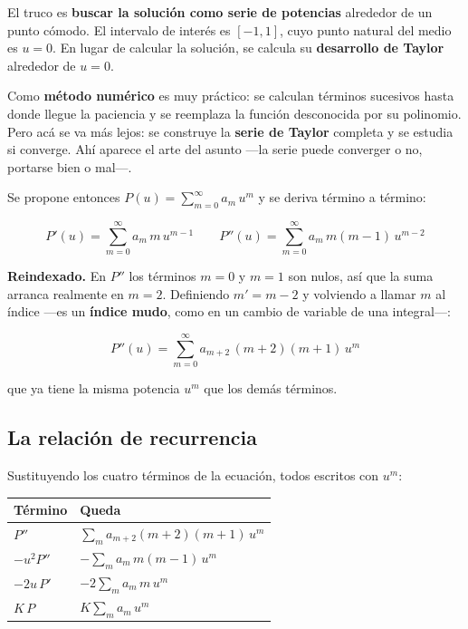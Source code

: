 \documentclass[12pt,a4paper]{article}
\begin{document}
El truco es \textbf{buscar la solución como serie de potencias} alrededor de un
punto cómodo. El intervalo de interés es $[-1,1]$, cuyo punto natural del medio
es $u=0$. En lugar de calcular la solución, se calcula su \textbf{desarrollo de
Taylor} alrededor de $u=0$.

\begin{notebox}
Como \textbf{método numérico} es muy práctico: se calculan términos sucesivos
hasta donde llegue la paciencia y se reemplaza la función desconocida por su
polinomio. Pero acá se va más lejos: se construye la \textbf{serie de Taylor}
completa y se estudia si converge. Ahí aparece el arte del asunto ---la serie
puede converger o no, portarse bien o mal---.
\end{notebox}

Se propone entonces $P(u) = \sum_{m=0}^{\infty} a_m\,u^{m}$ y se deriva término a
término:

\[
P'(u) = \sum_{m=0}^{\infty} a_m\,m\,u^{m-1}
\qquad
P''(u) = \sum_{m=0}^{\infty} a_m\,m(m-1)\,u^{m-2}
\]

\textbf{Reindexado.} En $P''$ los términos $m=0$ y $m=1$ son nulos, así que la
suma arranca realmente en $m=2$. Definiendo $m' = m-2$ y volviendo a llamar $m$
al índice ---es un \textbf{índice mudo}, como en un cambio de variable de una
integral---:

\[
P''(u) = \sum_{m=0}^{\infty} a_{m+2}\,(m+2)(m+1)\,u^{m}
\]

que ya tiene la misma potencia $u^m$ que los demás términos.

\subsection{La relación de recurrencia}

Sustituyendo los cuatro términos de la ecuación, todos escritos con $u^m$:

\begin{table}[H]
  \centering
  \begin{tabular}{@{}ll@{}}
    \toprule
    \textbf{Término} & \textbf{Queda} \\
    \midrule
    $P''$      & $\sum_m a_{m+2}(m+2)(m+1)\,u^m$ \\
    $-u^2 P''$ & $-\sum_m a_m\,m(m-1)\,u^m$ \\
    $-2u\,P'$  & $-2\sum_m a_m\,m\,u^m$ \\
    $K\,P$     & $K\sum_m a_m\,u^m$ \\
    \bottomrule
  \end{tabular}
\end{table}
\end{document}
